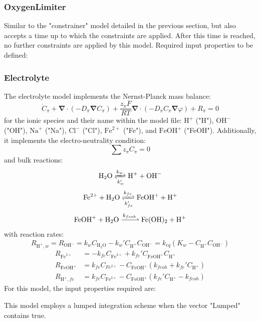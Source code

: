 \documentclass[3p]{elsarticle} %
\begin{document}
\subsubsection{OxygenLimiter}
Similar to the "constrainer" model detailed in the previous section, but also accepts a time up to which the constraints are applied. After this time is reached, no further constraints are applied by this model. Required input properties to be defined:


\subsubsection{Electrolyte}
The electrolyte model implements the Nernst-Planck mass balance:
\begin{equation}
    \dot{C}_{\pi}+\bm{\nabla}\cdot\left(-D_\pi \bm{\nabla}C_\pi\right) + \frac{z_\pi F}{RT} \bm{\nabla} \cdot \left(-D_\pi C_\pi \bm{\nabla} \varphi\right) +R_\pi = 0 
\end{equation}
for the ionic species and their name within the model file: $\mathrm{H}^+$ ("H"), $\mathrm{OH}^-$ ("OH"), $\mathrm{Na}^+$ ("Na"), $\mathrm{Cl}^-$ ("Cl"), $\mathrm{Fe}^{2+}$ ("Fe"), and $\mathrm{FeOH}^{+}$ ("FeOH"). Additionally, it implements the electro-neutrality condition:
\begin{equation}
	\sum z_\pi C_\pi = 0
\end{equation}
and bulk reactions:
\begin{equation}
    \mathrm{H}_2\mathrm{O} \xrightleftharpoons[k_{w}']{k_{w}} \mathrm{H}^+ + \mathrm{OH}^- \label{react:water}
\end{equation}
\begin{equation}
    \mathrm{Fe}^{2+} + \mathrm{H}_2\mathrm{O} \xrightleftharpoons[k_{fe}']{k_{fe}} \mathrm{FeOH}^+ + \mathrm{H}^+ \label{react:fe_feoh}
\end{equation}
\begin{equation}
    \mathrm{FeOH}^{+} + \mathrm{H}_2\mathrm{O} \xrightharpoonup{k_{feoh}} \mathrm{Fe}(\mathrm{OH})_2 + \mathrm{H}^+ \label{react:feoh_feoh2}
\end{equation}
with reaction rates:
\begin{equation}
    R_{\mathrm{H}^+,w}=R_{\mathrm{OH}^-} = k_{w}C_{\mathrm{H}_2\mathrm{O}} - k_{w}'C_{\mathrm{H}^+}C_{\mathrm{OH}^-}  = k_{eq} \left(K_w-C_{\mathrm{H}^+} C_{\mathrm{OH}^-} \right) \label{eq:water_react}
\end{equation}
\begin{align}
    R_{\mathrm{Fe}^{2+}}&=-k_{fe}C_{\mathrm{Fe}^{2+}}+k_{fe}'C_{\mathrm{FeOH}^+}C_{\mathrm{H}^+} \\
    R_{\mathrm{FeOH}^+}&=k_{fe}C_{Fe^{2+}}-C_{\mathrm{FeOH}^+}(k_{feoh}+k_{fe}'C_{\mathrm{H}^+})\\
    R_{\mathrm{H}^+,fe}&=k_{fe}C_{\mathrm{Fe}^{2+}}-C_{\mathrm{FeOH}^+}(k_{fe}'C_{\mathrm{H}^+}-k_{feoh}) \label{eq:H_Part2}
\end{align}
For this model, the input properties required are:

This model employs a lumped integration scheme when the vector "Lumped" contains true.
\end{document}
